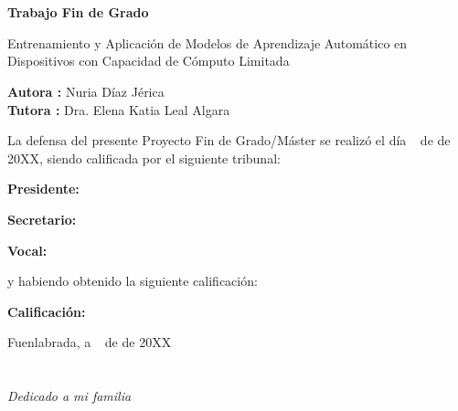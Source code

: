 \documentclass[a4paper, 12pt]{book}
\begin{document}
\newpage
\mbox{}
\thispagestyle{empty} %


\clearpage
{}
\chapter*{}

\vspace{-4cm}
\begin{center}
\LARGE
\textbf{Trabajo Fin de Grado}

\vspace{1cm}
\large
Entrenamiento y Aplicación de Modelos de Aprendizaje Automático en Dispositivos con Capacidad de Cómputo Limitada

\vspace{1cm}
\large
\textbf{Autora :} Nuria Díaz Jérica  \\
\textbf{Tutora :} Dra. Elena Katia Leal Algara

\end{center}

\vspace{1cm}
La defensa del presente Proyecto Fin de Grado/Máster se realizó el día \qquad$\;\,$ de
\qquad\qquad\qquad\qquad \newline de 20XX, siendo calificada por el siguiente tribunal:


\vspace{0.5cm}
\textbf{Presidente:}

\vspace{0.8cm}
\textbf{Secretario:}

\vspace{0.8cm}
\textbf{Vocal:}


\vspace{0.8cm}
y habiendo obtenido la siguiente calificación:

\vspace{0.8cm}
\textbf{Calificación:}


\vspace{0.8cm}
\begin{flushright}
Fuenlabrada, a \qquad$\;\,$ de \qquad\qquad\qquad\qquad de 20XX
\end{flushright}


\chapter*{}
\begin{flushright}
\textit{Dedicado a mi familia \\
}
\end{flushright}
\end{document}
